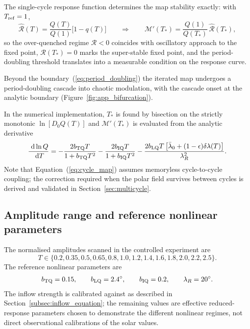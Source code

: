 \documentclass[namedreferences,hyperref,optionalrh,solaromanenum]{spr-sola}
\newcommand{\rmd}{{\ \mathrm d}}
\begin{document}
The single-cycle response function determines the map stability exactly:
with $T_{\rm ref}=1$,
%
\begin{equation}
\hat{\mathcal{R}}(T)
=
\frac{Q(T)}{Q(1)}\bigl[1-q(T)\bigr]
\qquad\Longrightarrow\qquad
\mathcal{M}'(T_*)
=
\frac{Q(1)}{Q(T_*)}\,\hat{\mathcal{R}}(T_*),
\label{eq:R_M_identity}
\end{equation}
%
so the over-quenched regime $\mathcal{R}<0$ coincides with oscillatory
approach to the fixed point, $\mathcal{R}(T_*)=0$ marks the super-stable
fixed point, and the period-doubling threshold translates into a
measurable condition on the response curve.

Beyond the boundary~(\ref{eq:period_doubling}) the iterated map undergoes
a period-doubling cascade into chaotic modulation, with the cascade onset
at the analytic boundary (Figure~\ref{fig:app_bifurcation}).

In the numerical implementation, $T_*$ is found by bisection on the
strictly monotonic $\ln[D_0Q(T)]$ and $\mathcal{M}'(T_*)$ is evaluated
from the analytic derivative
%
\begin{equation}
\frac{\rmd\ln Q}{\rmd T}
=
-\frac{2b_{\rm TQ}T}{1+b_{\rm TQ}T^2}
-
\frac{2b_{\rm IQ}T}{1+b_{\rm IQ}T^2}
-
\frac{
2b_{\rm LQ}T
\left[
\bar{\lambda}_0+(1-\epsilon)\delta\lambda(T)
\right]
}
{\lambda_R^2}.
\label{eq:dlnQdT}
\end{equation}
%
Note that Equation~(\ref{eq:cycle_map}) assumes memoryless cycle-to-cycle
coupling; the correction required when the polar field survives between
cycles is derived and validated in Section~\ref{sec:multicycle}.

\subsection{Amplitude range and reference nonlinear parameters}
\label{subsec:reference_params}

The normalised amplitudes scanned in the controlled experiment are
%
\begin{equation}
T
\in
\{
0.2,0.35,0.5,0.65,0.8,1.0,1.2,1.4,
1.6,1.8,2.0,2.2,2.5
\}.
\label{eq:T_values}
\end{equation}
%
The reference nonlinear parameters are
%
\begin{equation}
b_{\rm TQ}=0.15,
\qquad
b_{\rm LQ}=2.4^\circ,
\qquad
b_{\rm IQ}=0.2,
\qquad
\lambda_R=20^\circ .
\label{eq:nonlinear_reference_params}
\end{equation}
%
The inflow strength is calibrated against \citet{Talafha2025} as described
in Section~\ref{subsec:inflow_equation}; the remaining values are
effective reduced-response parameters chosen to demonstrate the different
nonlinear regimes, not direct observational calibrations of the solar
values.
\end{document}
